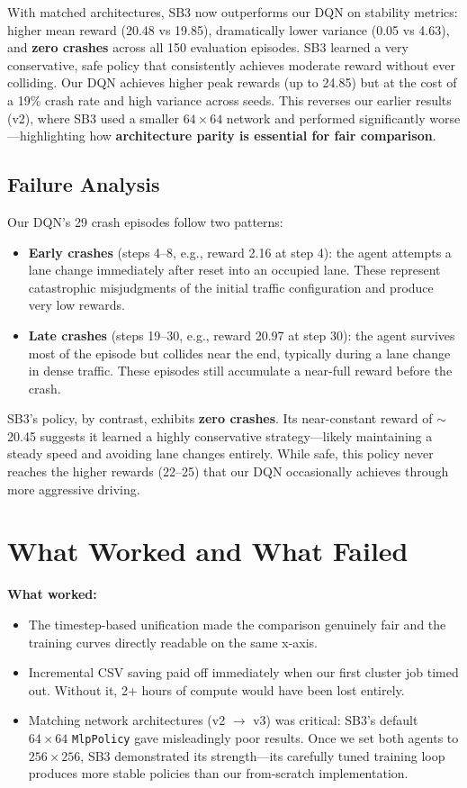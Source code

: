 \documentclass[11pt,a4paper]{article}
\begin{document}
With matched architectures, SB3 now outperforms our DQN on stability metrics: higher mean reward (20.48 vs 19.85), dramatically lower variance (0.05 vs 4.63), and \textbf{zero crashes} across all 150 evaluation episodes. SB3 learned a very conservative, safe policy that consistently achieves moderate reward without ever colliding. Our DQN achieves higher peak rewards (up to 24.85) but at the cost of a 19\% crash rate and high variance across seeds. This reverses our earlier results (v2), where SB3 used a smaller $64 \times 64$ network and performed significantly worse---highlighting how \textbf{architecture parity is essential for fair comparison}.

\subsection{Failure Analysis}

Our DQN's 29 crash episodes follow two patterns:
\begin{itemize}
    \item \textbf{Early crashes} (steps 4--8, e.g., reward 2.16 at step 4): the agent attempts a lane change immediately after reset into an occupied lane. These represent catastrophic misjudgments of the initial traffic configuration and produce very low rewards.
    \item \textbf{Late crashes} (steps 19--30, e.g., reward 20.97 at step 30): the agent survives most of the episode but collides near the end, typically during a lane change in dense traffic. These episodes still accumulate a near-full reward before the crash.
\end{itemize}

SB3's policy, by contrast, exhibits \textbf{zero crashes}. Its near-constant reward of $\sim$20.45 suggests it learned a highly conservative strategy---likely maintaining a steady speed and avoiding lane changes entirely. While safe, this policy never reaches the higher rewards (22--25) that our DQN occasionally achieves through more aggressive driving.

\section{What Worked and What Failed}

\textbf{What worked:}
\begin{itemize}
    \item The timestep-based unification made the comparison genuinely fair and the training curves directly readable on the same x-axis.
    \item Incremental CSV saving paid off immediately when our first cluster job timed out. Without it, 2+ hours of compute would have been lost entirely.
    \item Matching network architectures (v2 $\to$ v3) was critical: SB3's default $64 \times 64$ \texttt{MlpPolicy} gave misleadingly poor results. Once we set both agents to $256 \times 256$, SB3 demonstrated its strength---its carefully tuned training loop produces more stable policies than our from-scratch implementation.
\end{itemize}
\end{document}
